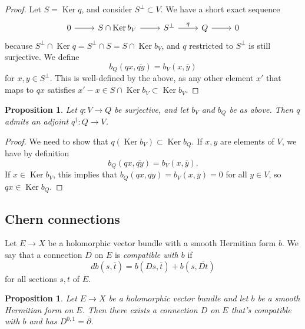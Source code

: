 \documentclass[10pt,a4paper]{article}
\newtheorem{prop}[theo]{Proposition}
\newtheorem*{proof}{Proof}
\def\ov#1{\overline{#1}}
\DeclareMathOperator{\Ker}{Ker}
\begin{document}
\begin{proof}
Let $S = \Ker q$, and consider $S^\perp \subset V$. We have a short exact sequence
\[
\begin{tikzcd}
0 \ar[r] &
S \cap \Ker b_V \ar[r] &
S^\perp \ar[r,"q"] &
Q \ar[r] &
0
\end{tikzcd}
\]
because $S^\perp \cap \Ker q = S^\perp \cap S = S \cap \Ker b_V$, and $q$ restricted to $S^\perp$ is still surjective. We define
\[
b_Q(qx, \ov{qy})
= b_V(x, \ov y)
\]
for $x, y \in S^\perp$. This is well-defined by the above, as any other element $x'$ that maps to $qx$ satisfies $x' - x \in S \cap \Ker b_V \subset \Ker b_V$.
\end{proof}


\begin{prop}
Let $q : V \to Q$ be surjective, and let $b_V$ and $b_Q$ be as above. Then $q$ admits an adjoint $q^\dagger : Q \to V$.
\end{prop}

\begin{proof}
We need to show that $q(\Ker b_V) \subset \Ker b_Q$. If $x, y$ are elements of $V$, we have by definition
\[
b_Q(qx, \ov{qy}) = b_V(x, \ov y).
\]
If $x \in \Ker b_V$, this implies that $b_Q(qx, \ov{qy}) = b_V(x, \ov y) = 0$ for all $y \in V$, so $qx \in \Ker b_Q$.
\end{proof}


\subsection{Chern connections}
\label{sec:degenerate-chern-connections}



Let $E \to X$ be a holomorphic vector bundle with a smooth Hermitian form $b$. We say that a connection $D$ on $E$ is \emph{compatible with $b$} if
\[
d b(s, \ov t) = b(Ds, \ov t) + b(s, \ov{Dt})
\]
for all sections $s, t$ of $E$.


\begin{prop}
Let $E \to X$ be a holomorphic vector bundle and let $b$ be a smooth Hermitian form on $E$. Then there exists a connection $D$ on $E$ that's compatible with $b$ and has $D^{0,1} = \bar\partial$.
\end{prop}
\end{document}
